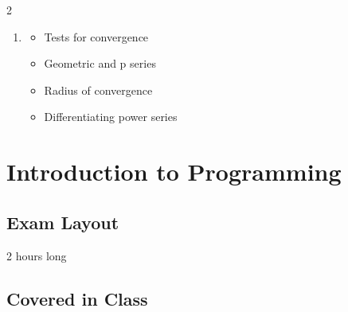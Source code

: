 \documentclass{article}
\begin{document}
\begin{multicols}{2}
\begin{enumerate}
\begin{itemize}
            \item Integration using partial fraction decomposition
        \end{itemize}
    \item \begin{itemize}
            \item Tests for convergence
            \item Geometric and p series
            \item Radius of convergence
            \item Differentiating power series
        \end{itemize}
\end{enumerate}
\end{multicols}

\newpage
\section*{Introduction to Programming}
\subsection*{Exam Layout}
2 hours long

\subsection*{Covered in Class}
\end{document}
